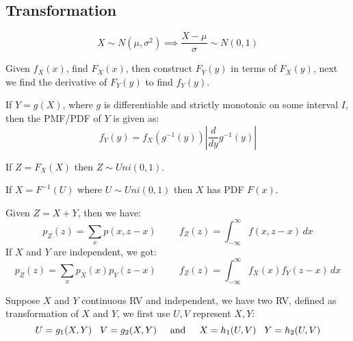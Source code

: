 \documentclass[12pt]{article}
\begin{document}
\begin{multicols*}{4}
    \section{Transformation}
    \begin{tcolorbox}[title=Normal Transformation (Normalize)]
        $$X\sim N(\mu, \sigma^2)\implies\frac{X-\mu}{\sigma}\sim N(0, 1)$$
    \end{tcolorbox}
    \begin{tcolorbox}[title=Direct Transformation Method]
        Given $f_X(x)$, find $F_X(x)$, then construct $F_Y(y)$ in terms of $F_X(y)$,
        next we find the derivative of $F_Y(y)$ to find $f_Y(y)$.
    \end{tcolorbox}
    \begin{tcolorbox}[title=Monotone Transformation Method]
        If $Y=g(X)$, where $g$ is differentiable and strictly monotonic on some interval $I$, then
        the PMF/PDF of $Y$ is given as:
        $$f_Y(y)=f_X(g^{-1}(y))\left|\frac{d}{dy}g^{-1}(y)\right|$$
    \end{tcolorbox}
    \begin{tcolorbox}[title=Probability Integral Transformation]
        If $Z=F_X(X)$ then $Z\sim Uni(0, 1)$.
    \end{tcolorbox}
    \begin{tcolorbox}[title=Inverse Integral Transformation]
        If $X=F^{-1}(U)$ where $U\sim Uni(0, 1)$ then $X$ has PDF $F(x)$.
    \end{tcolorbox}
    \begin{tcolorbox}[title=Convolution Method (Sum of two RV)]
        Given $Z=X+Y$, then we have:
        $$p_Z(z)=\sum_{x}p(x, z-x)\hspace{1cm}f_Z(z)=\int_{-\infty}^\infty f(x, z-x)\,dx$$
        If $X$ and $Y$ are independent, we got:
        $$p_Z(z)=\sum_{x}p_X(x)p_Y(z-x)\hspace{1cm}f_Z(z)=\int_{-\infty}^\infty f_X(x)f_Y(z-x)\,dx$$
    \end{tcolorbox}
    \begin{tcolorbox}[title=Bivariate Transformation Method]
        Suppose $X$ and $Y$ continuous RV and independent, we have two RV, defined as transformation of $X$ and $Y$, we first use $U,V$ represent $X,Y$:
        $$U=g_1(X, Y)\hspace{0.3cm}V=g_2(X, Y)\hspace{0.5cm}\text{and}\hspace{0.5cm}X=h_1(U, V)\hspace{0.3cm}Y=h_2(U, V)$$

\end{tcolorbox}
\end{multicols*}
\end{document}
